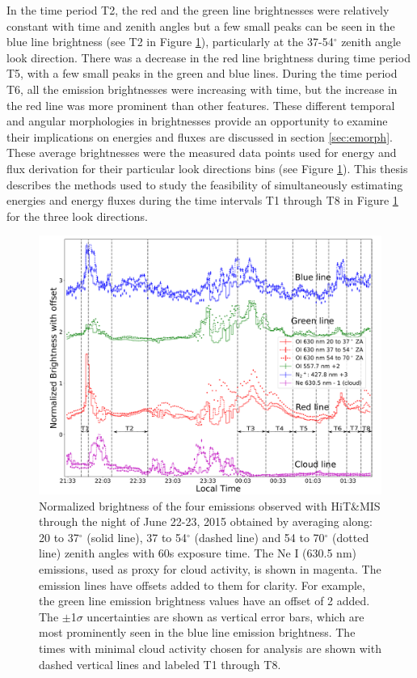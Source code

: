 \documentclass[crop=false,class=mitthesis,oneside,font=12pt]{standalone}
\begin{document}
In the time period T2, the red and the green line brightnesses were relatively constant with time and zenith angles but a few small peaks can be seen in the blue line brightness (see T2 in Figure \ref{feature:nbrg}), particularly at the 37-54$^\circ$ zenith angle look direction. 
There was a decrease in the red line brightness during time period T5, with a few small peaks in the green and blue lines. During the time period T6, all the emission brightnesses were increasing with time, but the increase in the red line was more prominent than other features. These different temporal and angular morphologies in brightnesses provide an opportunity to examine their implications on energies and fluxes are discussed in section \ref{sec:emorph}. These average brightnesses were the measured data points used for energy and flux derivation for their particular look directions bins (see Figure \ref{feature:nbrg}). This thesis describes the methods used to study the feasibility of simultaneously estimating energies and energy fluxes during the time intervals T1 through T8 in Figure \ref{feature:nbrg} for the three look directions. 
\begin{figure}[H]
	\centering\includegraphics[width=35pc]{nbgr.pdf}
	\caption{Normalized brightness of the four emissions observed with HiT\&MIS through the night of June 22-23, 2015 obtained by averaging along: 20 to 37$^\circ$ (solid line), 37 to 54$^\circ$ (dashed line) and 54 to 70$^\circ$ (dotted line) zenith angles with 60s exposure time. The Ne I (630.5 nm) emissions, used as proxy for cloud activity, is shown in magenta.  
		The emission lines have offsets added to them for clarity. For example, the green line emission brightness values have an offset of 2 added. The $\pm$1$\sigma$ uncertainties are shown as vertical error bars, which are most prominently seen in the blue line emission brightness.
		The times with minimal cloud activity chosen for analysis are shown with dashed vertical lines and labeled T1 through T8.}
	\label{feature:nbrg}
\end{figure}
\end{document}
